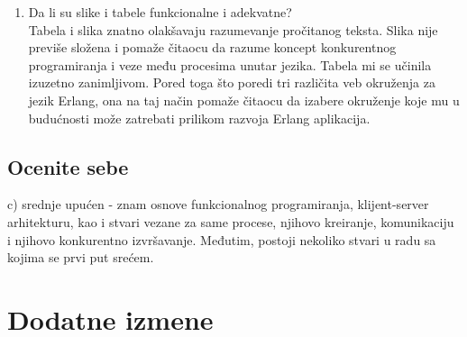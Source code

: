 \documentclass[a4paper]{report}
\begin{document}
\begin{enumerate}
\item Da li su slike i tabele funkcionalne i adekvatne?\\
Tabela i slika znatno olakšavaju razumevanje pročitanog teksta. Slika nije previše složena i pomaže čitaocu da razume koncept konkurentnog programiranja i veze među procesima unutar jezika. Tabela mi se učinila izuzetno zanimljivom. Pored toga što poredi tri različita veb okruženja za jezik Erlang, ona na taj način pomaže čitaocu da izabere okruženje koje mu u budućnosti može zatrebati prilikom razvoja Erlang aplikacija.


\end{enumerate}

\section{Ocenite sebe}
c) srednje upućen - znam osnove funkcionalnog programiranja, klijent-server arhitekturu, kao i stvari vezane za same procese, njihovo kreiranje, komunikaciju i njihovo konkurentno izvršavanje. Međutim, postoji nekoliko stvari u radu sa kojima se prvi put srećem.


\chapter{Dodatne izmene}
\end{document}
